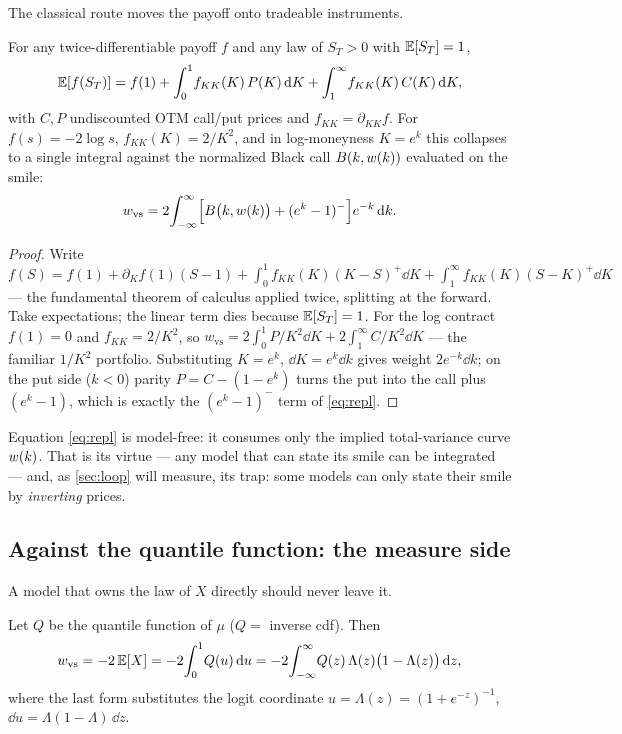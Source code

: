 \documentclass[11pt]{article}
\newcommand{\wvs}{w_{\mathrm{vs}}}
\newcommand{\Lo}{\Lambda}
\begin{document}
The classical route moves the payoff onto tradeable instruments.

\begin{proposition}
\label{prop:strike}
For any twice-differentiable payoff $f$ and any law of $S_T>0$ with
$\mathbb{E}[S_T]=1$,
\begin{equation*}
\mathbb{E}[f(S_T)]=f(1)+\int_0^{1}\!f_{KK}(K)\,P(K)\,\mathrm{d} K
+\int_1^{\infty}\!f_{KK}(K)\,C(K)\,\mathrm{d} K,
\end{equation*}
with $C,P$ undiscounted OTM call/put prices and $f_{KK}=\partial_{KK}f$.
For $f(s)=-2\log s$, $f_{KK}(K)=2/K^{2}$, and in log-moneyness
$K=e^{k}$ this collapses to a single integral against the normalized
Black call $B(k,w(k))$ evaluated on the smile:
\begin{equation}
\wvs
=2\!\int_{-\infty}^{\infty}\!
\Big[\Black\big(k,\tvar(k)\big)+(e^{k}-1)^-\Big]e^{-k}\,\dd k .
\label{eq:repl}
\end{equation}
\end{proposition}

\begin{proof}
Write $f(S)=f(1)+\partial_K f(1)(S-1)+\int_0^{1}f_{KK}(K)(K-S)^+\dd K
+\int_1^{\infty}f_{KK}(K)(S-K)^+\dd K$ --- the fundamental theorem of
calculus applied twice, splitting at the forward.  Take expectations; the
linear term dies because $\mathbb{E}[S_T]=1$.  For the log contract $f(1)=0$ and
$f_{KK}=2/K^2$, so $\wvs=2\int_0^1 P/K^2\dd K+2\int_1^\infty C/K^2\dd K$
--- the familiar $1/K^{2}$ portfolio.  Substituting $K=e^{k}$,
$\dd K=e^{k}\dd k$ gives weight $2e^{-k}\dd k$; on the put side
($k<0$) parity $P=C-(1-e^{k})$ turns the put into the call plus
$(e^{k}-1)$, which is exactly the $(e^{k}-1)^-$ term of \eqref{eq:repl}.
\end{proof}

Equation \eqref{eq:repl} is model-free: it consumes only the implied
total-variance curve $w(k)$.  That is its virtue --- any model that
can state its smile can be integrated --- and, as \cref{sec:loop} will
measure, its trap: some models can only state their smile by
\emph{inverting} prices.

\subsection{Against the quantile function: the measure side}

A model that owns the law of $X$ directly should never leave it.

\begin{proposition}
\label{prop:quantile}
Let $Q$ be the quantile function of $\mu$ ($Q=$ inverse cdf).  Then
\begin{equation}
\wvs=-2\,\E[X]=-2\!\int_0^1\!Q(u)\,\dd u
=-2\!\int_{-\infty}^{\infty}\!Q(z)\,\Lo(z)\big(1-\Lo(z)\big)\,\dd z,
\label{eq:lqd_vs}
\end{equation}
where the last form substitutes the logit coordinate $u=\Lo(z)=
(1+e^{-z})^{-1}$, $\dd u=\Lo(1-\Lo)\,\dd z$.
\end{proposition}
\end{document}
